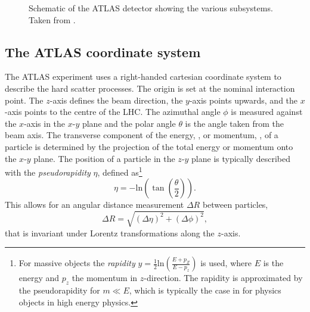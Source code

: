 

\begin{figure}
    \caption[Schematic of the ATLAS detector showing the various subsystems.]{Schematic of the ATLAS detector showing the various subsystems. Taken from .}
    \label{fig:ATLASlayout}
\end{figure}

\subsection{The ATLAS coordinate system}
The ATLAS experiment uses a right-handed cartesian coordinate system to describe the hard scatter processes. The origin is set at the nominal interaction point. The $z$-axis defines the beam direction, the $y$-axis points upwards, and the $x$-axis points to the centre of the LHC. The azimuthal angle $\phi$ is measured against the $x$-axis in the $x$-$y$ plane and the polar angle $\theta$ is the angle taken from the beam axis. 
The transverse component of the energy, \ET, or momentum, \pT, of a particle is determined by the projection of the total energy or momentum onto the $x$-$y$ plane.
The position of a particle in the $z$-$y$ plane is typically described with the \emph{pseudorapidity} $\eta$, defined as\footnote{For massive objects the \emph{rapidity} $y = \frac{1}{2} \text{ln} \left( \frac{E + p_Z }{E-p_z} \right)$ is used, where $E$ is the energy and $p_z$ the momentum in $z$-direction. The rapidity is approximated by the pseudorapidity for $m \ll E$, which is typically the case in for physics objects in high energy physics.}
\begin{equation}
    \eta = - \text{ln} \left( \tan \left( \frac{\theta}{2} \right) \right).
\end{equation}
This allows for an angular distance measurement $\Delta R$ between particles,
\begin{equation}
    \Delta R = \sqrt{ \left( \Delta \eta \right) ^2 + \left( \Delta \phi \right) ^2 },
\end{equation}
that is invariant under Lorentz transformations along the $z$-axis. 


